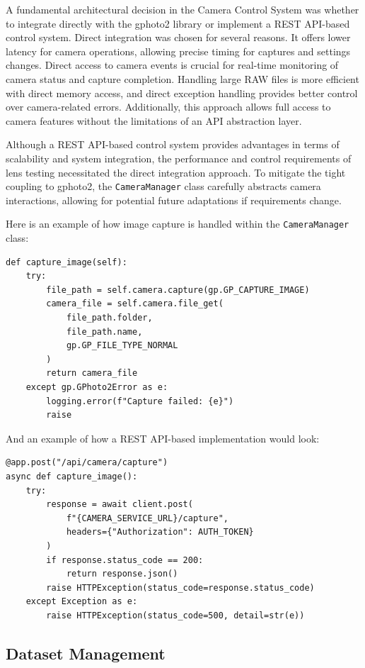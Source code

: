 A fundamental architectural decision in the Camera Control System was whether to integrate directly with the gphoto2 library or implement a REST API-based control system. Direct integration was chosen for several reasons. It offers lower latency for camera operations, allowing precise timing for captures and settings changes. Direct access to camera events is crucial for real-time monitoring of camera status and capture completion. Handling large RAW files is more efficient with direct memory access, and direct exception handling provides better control over camera-related errors. Additionally, this approach allows full access to camera features without the limitations of an API abstraction layer.

Although a REST API-based control system provides advantages in terms of scalability and system integration, the performance and control requirements of lens testing necessitated the direct integration approach. To mitigate the tight coupling to gphoto2, the \texttt{CameraManager} class carefully abstracts camera interactions, allowing for potential future adaptations if requirements change.

Here is an example of how image capture is handled within the \texttt{CameraManager} class:

\begin{verbatim}
def capture_image(self):
    try:
        file_path = self.camera.capture(gp.GP_CAPTURE_IMAGE)
        camera_file = self.camera.file_get(
            file_path.folder,
            file_path.name,
            gp.GP_FILE_TYPE_NORMAL
        )
        return camera_file
    except gp.GPhoto2Error as e:
        logging.error(f"Capture failed: {e}")
        raise
\end{verbatim}

And an example of how a REST API-based implementation would look:

\begin{verbatim}
@app.post("/api/camera/capture")
async def capture_image():
    try:
        response = await client.post(
            f"{CAMERA_SERVICE_URL}/capture",
            headers={"Authorization": AUTH_TOKEN}
        )
        if response.status_code == 200:
            return response.json()
        raise HTTPException(status_code=response.status_code)
    except Exception as e:
        raise HTTPException(status_code=500, detail=str(e))
\end{verbatim}

\subsection{Dataset Management}

